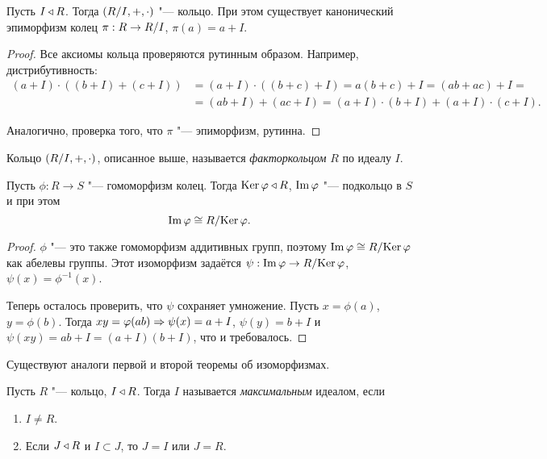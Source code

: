 \documentclass[main]{subfiles}
\begin{document}
\begin{theorem}
  Пусть \( I \triangleleft R \). Тогда \( (\Factor{R}[I], +, \cdot) \) "---
  кольцо. При этом существует канонический эпиморфизм колец
  \( \pi : R \to \Factor{R}[I] \), \( \pi(a) = a + I \).
\end{theorem}
\begin{proof}
  Все аксиомы кольца проверяются рутинным образом.
  Например, дистрибутивность:
  \begin{align}
    (a + I) \cdot ((b + I) + (c + I)) &=
    (a + I) \cdot ((b + c) + I) =
    a(b + c) + I = (ab + ac) + I = \\
    &= (ab + I) + (ac + I) =
    (a + I) \cdot (b + I) + (a + I) \cdot (c + I).
  \end{align}

  Аналогично, проверка того, что \( \pi \) "---
  эпиморфизм, рутинна.
\end{proof}

\begin{definition}
  Кольцо \( (\Factor{R}[I], +, \cdot) \), описанное выше,
  называется \emph{факторкольцом} \( R \) по идеалу \( I \).
\end{definition}

\begin{theorem}
  Пусть \( \phi : R \to S \) "--- гомоморфизм колец.
  Тогда \( \operatorname{Ker} \varphi \triangleleft R \), \( \operatorname{Im} \varphi \) "---
  подкольцо в \( S \) и при этом
  \[
    \Img \phi \cong \Factor{R}[\Ker \phi].
  \]
\end{theorem}
\begin{proof}
  \( \phi \) "--- это также гомоморфизм аддитивных групп,
  поэтому \( \Img \phi \cong \Factor{R}[\Ker \phi] \) как
  абелевы группы. Этот изоморфизм задаётся
  \( \psi : \Img \phi \to \Factor{R}[\Ker \phi] \),
  \( \psi(x) = \phi^{-1}(x) \).

  Теперь осталось проверить, что \( \psi \) сохраняет
  умножение. Пусть \( x = \phi(a) \), \( y = \phi(b) \).
  Тогда \( xy = \varphi(ab) \Rightarrow \psi(x) = a + I \),
  \( \psi(y) = b + I \) и \( \psi(xy) = ab + I = (a + I)(b + I) \),
  что и требовалось.
\end{proof}
\begin{remark}
  Существуют аналоги первой и второй теоремы об изоморфизмах.
\end{remark}

\begin{definition}
  Пусть \( R \) "--- кольцо, \( I \triangleleft R \).
  Тогда \( I \) называется \emph{максимальным} идеалом,
  если
  \begin{enumerate}
    \item \( I \ne R \).
    \item Если \( J \triangleleft R \) и \( I \subset J \),
      то \( J = I \) или \( J = R \).
  \end{enumerate}
\end{definition}
\end{document}
